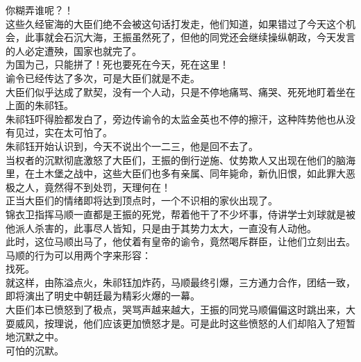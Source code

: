 \begin{multicols}{\theparacolNo}
你糊弄谁呢？！\\

这些久经宦海的大臣们绝不会被这句话打发走，他们知道，如果错过了今天这个机会，此事就会石沉大海，王振虽然死了，但他的同党还会继续操纵朝政，今天发言的人必定遭殃，国家也就完了。\\

为国为己，只能拼了！死也要死在今天，死在这里！\\

谕令已经传达了多次，可是大臣们就是不走。\\

大臣们似乎达成了默契，没有一个人动，只是不停地痛骂、痛哭、死死地盯着坐在上面的朱祁钰。\\

朱祁钰吓得脸都发白了，旁边传谕令的太监金英也不停的擦汗，这种阵势他也从没有见过，实在太可怕了。\\

朱祁钰开始认识到，今天不说出个一二三，他是回不去了。\\

当权者的沉默彻底激怒了大臣们，王振的倒行逆施、仗势欺人又出现在他们的脑海里，在土木堡之战中，这些大臣们也多有亲属、同年毙命，新仇旧恨，如此罪大恶极之人，竟然得不到处罚，天理何在！\\

正当大臣们的情绪即将达到顶点时，一个不识相的家伙出现了。\\

锦衣卫指挥马顺一直都是王振的死党，帮着他干了不少坏事，侍讲学士刘球就是被他派人杀害的，此事尽人皆知，只是由于其势力太大，一直没有人动他。\\

此时，这位马顺出马了，他仗着有皇帝的谕令，竟然喝斥群臣，让他们立刻出去。\\

马顺的行为可以用两个字来形容：\\

找死。\\

就这样，由陈溢点火，朱祁钰加炸药，马顺最终引爆，三方通力合作，团结一致，即将演出了明史中朝廷最为精彩火爆的一幕。\\

大臣们本已愤怒到了极点，哭骂声越来越大，王振的同党马顺偏偏这时跳出来，大耍威风，按理说，他们应该更加愤怒才是。可是此时这些愤怒的人们却陷入了短暂地沉默之中。\\

可怕的沉默。\\


\end{multicols}
